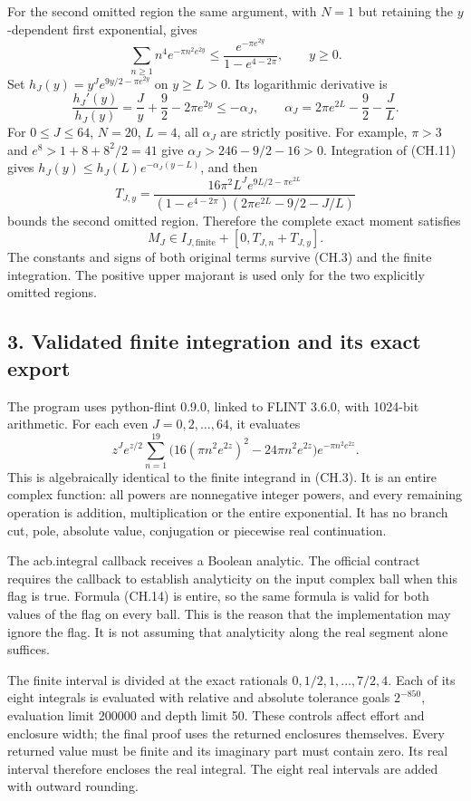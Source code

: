 For the second omitted region the same argument, with \(N=1\) but retaining the \(y\)-dependent first exponential, gives \[
 \sum_{n\ge1}n^4e^{-\pi n^2e^{2y}}
 \le
 \frac{e^{-\pi e^{2y}}}{1-e^{4-2\pi}},
 \qquad y\ge0 .
\tag{CH.10}
\] Set \(h_J(y)=y^Je^{9y/2-\pi e^{2y}}\) on \(y\ge L>0\). Its logarithmic derivative is \[
 \frac{h_J'(y)}{h_J(y)}
 =\frac Jy+\frac92-2\pi e^{2y}
 \le-\alpha_J,\qquad
 \alpha_J=2\pi e^{2L}-\frac92-\frac JL .
\tag{CH.11}
\] For \(0\le J\le64\), \(N=20\), \(L=4\), all \(\alpha_J\) are strictly positive. For example, \(\pi>3\) and \(e^8>1+8+8^2/2=41\) give \(\alpha_J>246-9/2-16>0\). Integration of (CH.11) gives \(h_J(y)\le h_J(L)e^{-\alpha_J(y-L)}\), and then \[
 T_{J,y}=
 \frac{16\pi^2 L^J e^{9L/2-\pi e^{2L}}}
 {(1-e^{4-2\pi})(2\pi e^{2L}-9/2-J/L)}
\tag{CH.12}
\] bounds the second omitted region. Therefore the complete exact moment satisfies \[
 M_J\in I_{J,\mathrm{finite}}+[0,T_{J,n}+T_{J,y}].
\tag{CH.13}
\] The constants and signs of both original terms survive (CH.3) and the finite integration. The positive upper majorant is used only for the two explicitly omitted regions.

\subsection{3. Validated finite integration and its exact export}\label{validated-finite-integration-and-its-exact-export}

The program uses python-flint 0.9.0, linked to FLINT 3.6.0, with 1024-bit arithmetic. For each even \(J=0,2,\ldots,64\), it evaluates \[
 z^J e^{z/2}\sum_{n=1}^{19}
 \bigl(16(\pi n^2e^{2z})^2-24\pi n^2e^{2z}\bigr)
 e^{-\pi n^2e^{2z}}.
\tag{CH.14}
\] This is algebraically identical to the finite integrand in (CH.3). It is an entire complex function: all powers are nonnegative integer powers, and every remaining operation is addition, multiplication or the entire exponential. It has no branch cut, pole, absolute value, conjugation or piecewise real continuation.

The acb.integral callback receives a Boolean analytic. The official contract requires the callback to establish analyticity on the input complex ball when this flag is true. Formula (CH.14) is entire, so the same formula is valid for both values of the flag on every ball. This is the reason that the implementation may ignore the flag. It is not assuming that analyticity along the real segment alone suffices.

The finite interval is divided at the exact rationals \(0,1/2,1,\ldots,7/2,4\). Each of its eight integrals is evaluated with relative and absolute tolerance goals \(2^{-850}\), evaluation limit 200000 and depth limit 50. These controls affect effort and enclosure width; the final proof uses the returned enclosures themselves. Every returned value must be finite and its imaginary part must contain zero. Its real interval therefore encloses the real integral. The eight real intervals are added with outward rounding.

